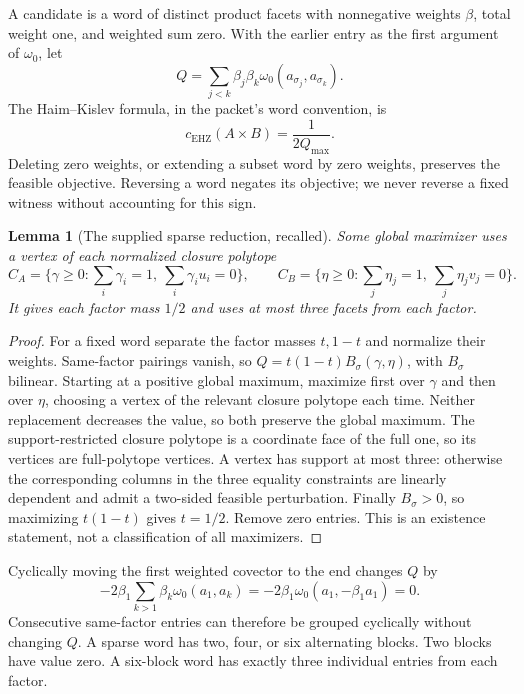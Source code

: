 \documentclass[11pt,a4paper]{article}
\newtheorem{lemma}[theorem]{Lemma}
\theoremstyle{definition}\newtheorem{definition}[theorem]{Definition}
\theoremstyle{remark}\newtheorem{remark}[theorem]{Remark}
\newcommand{\capc}{c_{\mathrm{EHZ}}}
\begin{document}
A candidate is a word of distinct product facets with nonnegative weights $\beta$, total weight one, and weighted sum zero. With the earlier entry as the first argument of $\omega_0$, let
\[
 Q=\sum_{j<k}\beta_j\beta_k\omega_0(a_{\sigma_j},a_{\sigma_k}).
\]
The Haim--Kislev formula, in the packet's word convention, is \cite[Theorem 1.1]{HK}
\begin{equation}\label{eq:HK}
 \capc(A\times B)=\frac1{2Q_{\max}}.
\end{equation}
Deleting zero weights, or extending a subset word by zero weights, preserves the feasible objective. Reversing a word negates its objective; we never reverse a fixed witness without accounting for this sign.

\begin{lemma}[The supplied sparse reduction, recalled]\label{lem:sparse}
Some global maximizer uses a vertex of each normalized closure polytope
\[
 C_A=\{\gamma\ge0:\sum_i\gamma_i=1,\ \sum_i\gamma_i u_i=0\},
 \qquad C_B=\{\eta\ge0:\sum_j\eta_j=1,\ \sum_j\eta_jv_j=0\}.
\]
It gives each factor mass $1/2$ and uses at most three facets from each factor.
\end{lemma}
\begin{proof}
For a fixed word separate the factor masses $t,1-t$ and normalize their weights. Same-factor pairings vanish, so $Q=t(1-t)B_\sigma(\gamma,\eta)$, with $B_\sigma$ bilinear. Starting at a positive global maximum, maximize first over $\gamma$ and then over $\eta$, choosing a vertex of the relevant closure polytope each time. Neither replacement decreases the value, so both preserve the global maximum. The support-restricted closure polytope is a coordinate face of the full one, so its vertices are full-polytope vertices. A vertex has support at most three: otherwise the corresponding columns in the three equality constraints are linearly dependent and admit a two-sided feasible perturbation. Finally $B_\sigma>0$, so maximizing $t(1-t)$ gives $t=1/2$. Remove zero entries. This is an existence statement, not a classification of all maximizers.
\end{proof}

Cyclically moving the first weighted covector to the end changes $Q$ by
\[
 -2\beta_1\sum_{k>1}\beta_k\omega_0(a_1,a_k)
 =-2\beta_1\omega_0(a_1,-\beta_1a_1)=0.
\]
Consecutive same-factor entries can therefore be grouped cyclically without changing $Q$. A sparse word has two, four, or six alternating blocks. Two blocks have value zero. A six-block word has exactly three individual entries from each factor.
\end{document}
